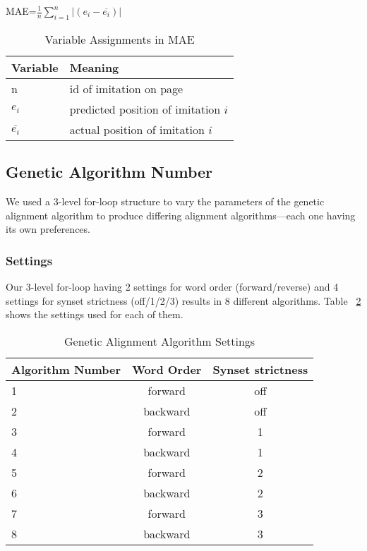 \begin{center}
	MAE=$\frac{1}{n}\sum_{i=1}^{n}{|(e_i-\overline{e_i})|}$
\end{center}

\begin{table}[center]
	\centering
	\begin{tabular} {| l | l |}
		\hline	\textbf{Variable} 	&	\textbf{Meaning} \\
		\hline	n					&	id of imitation on page				\\
		\hline	$e_i$				&	predicted position of imitation $i$	\\
		\hline	$\overline{e_i}$	&	actual position of imitation $i$	\\ \hline
	\end{tabular}
	\caption{Variable Assignments in MAE}
	\label{tab:variable_assignments}
\end{table}


\subsection{Genetic Algorithm Number}%
We used a 3-level for-loop structure to vary the parameters of the genetic alignment algorithm to produce differing alignment algorithms---each one having its own preferences. 

\subsubsection{Settings}
Our 3-level for-loop having 2 settings for word order (forward/reverse) and 4 settings for synset strictness (off/1/2/3) results in 8 different algorithms. Table ~\ref{tab:settings} shows the settings used for each of them.%

\begin{table}[center]
	\centering
	\begin{tabular} {|l | c | c |}
		\hline	\textbf{Algorithm Number} & \textbf{Word Order} & \textbf{Synset strictness}\\
		\hline	1	&	forward		&	off	\\
		\hline	2	&	backward	&	off	\\
		\hline	3	&	forward		&	1	\\
		\hline	4	&	backward	&	1	\\
		\hline	5	&	forward		&	2	\\
		\hline	6	&	backward	&	2	\\
		\hline	7	&	forward		&	3	\\
		\hline	8	&	backward	&	3	\\ \hline
	\end{tabular}
	\caption{Genetic Alignment Algorithm Settings}
	\label{tab:settings}
\end{table}
